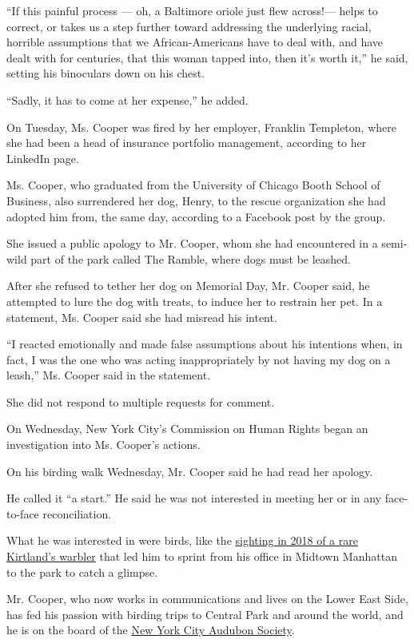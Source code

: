 ``If this painful process --- oh, a Baltimore oriole just flew
across!--- helps to correct, or takes us a step further toward
addressing the underlying racial, horrible assumptions that we
African-Americans have to deal with, and have dealt with for centuries,
that this woman tapped into, then it's worth it,'' he said, setting his
binoculars down on his chest.

``Sadly, it has to come at her expense,'' he added.

On Tuesday, Ms. Cooper was fired by her employer, Franklin Templeton,
where she had been a head of insurance portfolio management, according
to her LinkedIn page.

Ms. Cooper, who graduated from the University of Chicago Booth School of
Business, also surrendered her dog, Henry, to the rescue organization
she had adopted him from, the same day, according to a Facebook post by
the group.

She issued a public apology to Mr. Cooper, whom she had encountered in a
semi-wild part of the park called The Ramble, where dogs must be
leashed.

After she refused to tether her dog on Memorial Day, Mr. Cooper said, he
attempted to lure the dog with treats, to induce her to restrain her
pet. In a statement, Ms. Cooper said she had misread his intent.

``I reacted emotionally and made false assumptions about his intentions
when, in fact, I was the one who was acting inappropriately by not
having my dog on a leash,'' Ms. Cooper said in the statement.

She did not respond to multiple requests for comment.

On Wednesday, New York City's Commission on Human Rights began an
investigation into Ms. Cooper's actions.

On his birding walk Wednesday, Mr. Cooper said he had read her apology.

He called it ``a start.'' He said he was not interested in meeting her
or in any face-to-face reconciliation.

What he was interested in were birds, like the
\href{https://gothamist.com/arts-entertainment/rare-sighting-of-kirtlands-warbler-in-central-park-sends-birdwatchers-into-hushed-frenzy}{sighting
in 2018 of a rare Kirtland's warbler} that led him to sprint from his
office in Midtown Manhattan to the park to catch a glimpse.

Mr. Cooper, who now works in communications and lives on the Lower East
Side, has fed his passion with birding trips to Central Park and around
the world, and he is on the board of the
\href{http://www.nycaudubon.org/leadership-a-governance/board-of-directors}{New
York City Audubon Society}.

